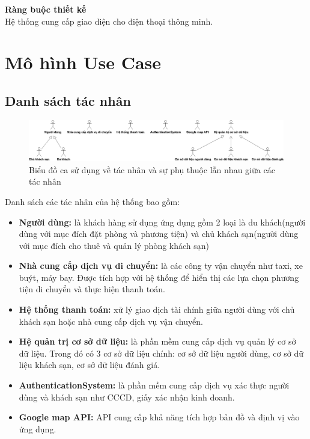 \textbf{Ràng buộc thiết kế}\\
\indent Hệ thống cung cấp giao diện cho điện thoại thông minh.
\section{Mô hình Use Case}
\subsection{Danh sách tác nhân}

\begin{figure}[H]
    \centering
    \includegraphics[width=\textwidth]{img/Use_Case-Actor.drawio.png} 
    \caption{ Biểu đồ ca sử dụng về tác nhân và sự phụ thuộc lẫn nhau giữa các tác nhân}
    \label{fig:actors}
\end{figure}

Danh sách các tác nhân của hệ thống bao gồm: 
\begin{itemize}
    \item \textbf{Người dùng:} là khách hàng sử dụng ứng dụng gồm 2 loại là du khách(người dùng với mục đích đặt phòng và phương tiện) và chủ khách sạn(người dùng với mục đích cho thuê và quản lý phòng khách sạn)
    \item \textbf{Nhà cung cấp dịch vụ di chuyển:} là các công ty vận chuyển như taxi, xe buýt, máy bay. Được tích hợp với hệ thống để hiển thị các lựa chọn phương tiện di chuyển và thực hiện thanh toán.
    \item \textbf{Hệ thống thanh toán:} xử lý giao dịch tài chính giữa người dùng với chủ khách sạn hoặc nhà cung cấp dịch vụ vận chuyển.
    \item \textbf{Hệ quản trị cơ sở dữ liệu:} là phần mềm cung cấp dịch vụ quản lý cơ sở dữ liệu. Trong đó có 3 cơ sở dữ liệu chính: cơ sở dữ liệu người dùng, cơ sở dữ liệu khách sạn, cơ sở dữ liệu đánh giá.
    \item \textbf{AuthenticationSystem:} là phần mềm cung cấp dịch vụ xác thực người dùng và khách sạn như CCCD, giấy xác nhận kinh doanh.
    \item \textbf{Google map API:} API cung cấp khả năng tích hợp bản đồ và định vị vào ứng dụng.
\end{itemize}

